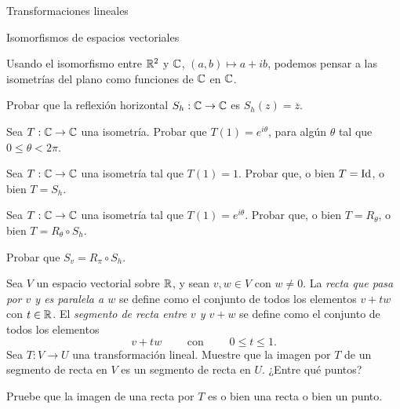 \begin{chapter}{Transformaciones lineales}
\begin{section}{Isomorfismos de espacios vectoriales}
\begin{enumex}
            \item Usando el isomorfismo entre $\mathbb R^2$ y $\mathbb C$, $(a,b)\mapsto a + ib$,  podemos pensar a las isometrías del plano como funciones de $\mathbb C$ en $\mathbb C$.
            \begin{enumex}
                \item  Probar que la reflexión horizontal  $S_h: \mathbb C \to \mathbb C$ es $S_h(z) = \overline{z}$. 
                \item Sea $T: \mathbb C \to \mathbb C$ una isometría. Probar que $T(1) =e^{i\theta}$, para algún $\theta$ tal que $0 \le \theta < 2\pi$. 
                \item Sea $T: \mathbb C \to \mathbb C$ una isometría tal que $T(1) =1$. Probar que, o bien $T = \operatorname{Id}$, o  bien $T = S_h$.
                \item  Sea $T: \mathbb C \to \mathbb C$ una isometría tal que $T(1) = e^{i\theta}$. Probar que, o bien $T = R_\theta$, o  bien $T = R_\theta \circ S_h$.
                \item Probar  que $S_v = R_\pi \circ S_h$. 
            \end{enumex}

            \item Sea $V$ un espacio vectorial sobre $\mathbb R$, y sean $v, w \in V$ con $w \ne 0$. La \textit{recta que pasa por $v$ y es paralela a $w$} se define como el conjunto de todos los elementos $v + tw$ con $t\in \mathbb R$.
            El \textit{segmento de recta entre $v$ y $v + w$} se define como el conjunto de todos los elementos
            $$
            v + tw \qquad  \text{ con } \qquad  0\le t \le 1. 
            $$
            Sea $T: V \to U$ una transformación lineal. Muestre que la imagen por $T$  de un segmento de recta en $V$ es un segmento de recta en $U$. ¿Entre qué puntos?
            
            Pruebe que la imagen de una recta por $T$  es o bien una recta  o bien un punto.
            

\end{enumex}
\end{section}
\end{chapter}
